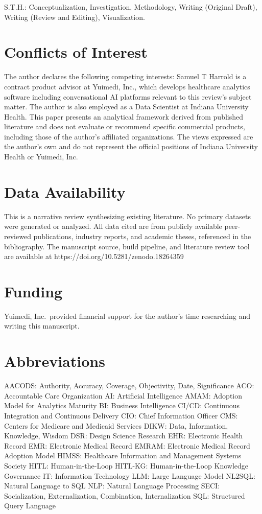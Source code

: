 \documentclass[
  american,
  11pt,
  letterpaper,
  oneside  ,captions=tableheading
]{scrartcl}
\begin{document}
S.T.H.: Conceptualization, Investigation, Methodology, Writing (Original
Draft), Writing (Review and Editing), Visualization.

\section{Conflicts of Interest}\label{conflicts-of-interest}

The author declares the following competing interests: Samuel T Harrold
is a contract product advisor at Yuimedi, Inc., which develops
healthcare analytics software including conversational AI platforms
relevant to this review's subject matter. The author is also employed as
a Data Scientist at Indiana University Health. This paper presents an
analytical framework derived from published literature and does not
evaluate or recommend specific commercial products, including those of
the author's affiliated organizations. The views expressed are the
author's own and do not represent the official positions of Indiana
University Health or Yuimedi, Inc.

\section{Data Availability}\label{data-availability}

This is a narrative review synthesizing existing literature. No primary
datasets were generated or analyzed. All data cited are from publicly
available peer-reviewed publications, industry reports, and academic
theses, referenced in the bibliography. The manuscript source, build
pipeline, and literature review tool are available at
https://doi.org/10.5281/zenodo.18264359

\section{Funding}\label{funding}

Yuimedi, Inc.~provided financial support for the author's time
researching and writing this manuscript.

\section{Abbreviations}\label{abbreviations}

AACODS: Authority, Accuracy, Coverage, Objectivity, Date, Significance
ACO: Accountable Care Organization AI: Artificial Intelligence AMAM:
Adoption Model for Analytics Maturity BI: Business Intelligence CI/CD:
Continuous Integration and Continuous Delivery CIO: Chief Information
Officer CMS: Centers for Medicare and Medicaid Services DIKW: Data,
Information, Knowledge, Wisdom DSR: Design Science Research EHR:
Electronic Health Record EMR: Electronic Medical Record EMRAM:
Electronic Medical Record Adoption Model HIMSS: Healthcare Information
and Management Systems Society HITL: Human-in-the-Loop HITL-KG:
Human-in-the-Loop Knowledge Governance IT: Information Technology LLM:
Large Language Model NL2SQL: Natural Language to SQL NLP: Natural
Language Processing SECI: Socialization, Externalization, Combination,
Internalization SQL: Structured Query Language
\end{document}
